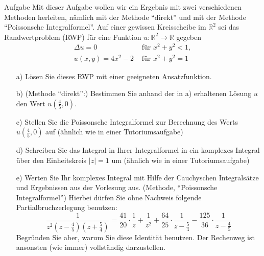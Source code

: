 \documentclass{scrartcl}
\begin{document}
\begin{section}{Aufgabe}
Mit dieser Aufgabe wollen wir ein Ergebnis mit zwei verschiedenen Methoden herleiten,
nämlich mit der Methode \enquote{direkt} und mit der Methode \enquote{Poissonsche Integralformel}.
Auf einer gewissen Kreisscheibe im \( \mathbb{R}^{2} \) sei das Randwertproblem (RWP) für eine Funktion \( u: \mathbb{R}^{2} \rightarrow \mathbb{R} \) gegeben 
\[ \begin{array}{ll} \Delta u=0 & \text { für } x^{2}+y^{2}<1, \\ u(x, y)=4 x^{2}-2 & \text { für } x^{2}+y^{2}=1 \end{array} \] 
\begin{itemize}
\item[a)]Lösen Sie dieses RWP mit einer geeigneten Ansatzfunktion. 
\item[b)] (Methode \enquote{direkt}:) Bestimmen Sie anhand der in a) erhaltenen Lösung \( u \) den Wert \( u\left(\frac{4}{5}, 0\right) \). 
\item[c)] Stellen Sie die Poissonsche Integralformel zur Berechnung des Werts \( u\left(\frac{4}{5}, 0\right) \) auf (ähnlich wie in einer Tutoriumsaufgabe) 
\item[d)] Schreiben Sie das Integral in Ihrer Integralformel in ein komplexes Integral über den Einheitskreis \( |z|=1 \) um (ähnlich wie in einer Tutoriumsaufgabe) 
\item[e)]  Werten Sie Ihr komplexes Integral mit Hilfe der Cauchyschen Integralsätze und Ergebnissen aus der Vorlesung aus. (Methode, \enquote{Poissonsche Integralformel}) Hierbei dürfen Sie ohne Nachweis folgende Partialbruchzerlegung benutzen: \[ \frac{1}{z^{2}\left(z-\frac{4}{5}\right)\left(z+\frac{5}{4}\right)}=\frac{41}{20} \cdot \frac{1}{z}+\frac{1}{z^{2}}+\frac{64}{25} \cdot 
\frac{1}{z-\frac{5}{4}}-\frac{125}{36} \cdot \frac{1}{z-\frac{4}{5}}\]
Begründen Sie aber, warum Sie diese Identität benutzen. Der Rechenweg ist ansonsten (wie immer) vollständig darzustellen.
\end{itemize}


\end{section}
\end{document}
